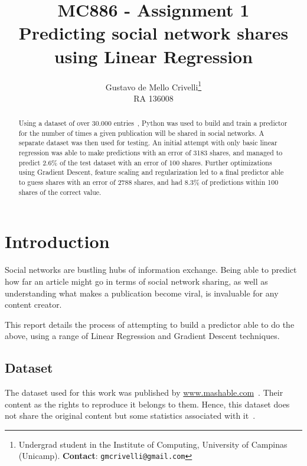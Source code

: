 \documentclass[10pt,twocolumn,letterpaper]{article}
\newcommand{\CITEONE}[2]{\mbox{#1 \cite{#2}}}
\begin{document}
\title{MC886 - Assignment 1\\
Predicting social network shares using Linear Regression}
\author{Gustavo de Mello Crivelli\thanks{Undergrad student in the Institute of Computing, University of Campinas (Unicamp). \textbf{Contact}: \tt\small{gmcrivelli@gmail.com}}\\
RA 136008}

\maketitle
\begin{abstract}
Using a dataset of over 30.000 \CITEONE{entries}{Dataset}, Python was used to build and train a predictor for the number of times a given publication will be shared in social networks. A separate dataset was then used for testing. An initial attempt with only basic linear regression was able to make predictions with an error of 3183 shares, and managed to predict 2.6\% of the test dataset with an error of 100 shares. Further optimizations using Gradient Descent, feature scaling and regularization led to a final predictor able to guess shares with an error of 2788 shares, and had 8.3\% of predictions within 100 shares of the correct value.
\end{abstract}

\section{Introduction}

Social networks are bustling hubs of information exchange. Being able to predict how far an article might go in terms of social network sharing, as well as understanding what makes a publication become viral, is invaluable for any content creator.

This report details the process of attempting to build a predictor able to do the above, using a range of Linear Regression and Gradient Descent techniques.

\subsection{Dataset}

The dataset used for this work was published by \hyperlink{www.mashable.com}{www.mashable.com}\CITEONE{}{Dataset}. Their content as the rights to reproduce it belongs to them. Hence, this dataset does not share the original content but some statistics associated with it\CITEONE{}{Portugal}.
\end{document}
